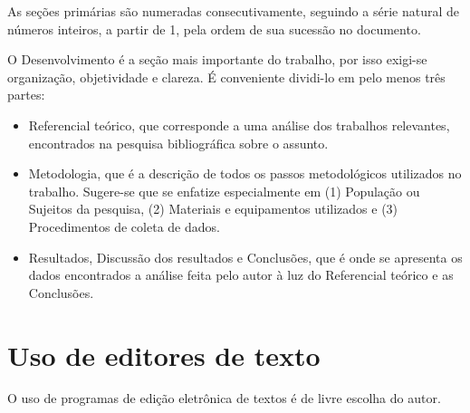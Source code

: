 As seções primárias são numeradas consecutivamente, seguindo a série 
natural de números inteiros, a partir de 1, pela ordem de sua sucessão no 
documento.

O Desenvolvimento é a seção mais importante do trabalho, por isso exigi-se 
organização, objetividade e clareza. É conveniente dividi-lo em pelo menos 
três partes:

\begin{itemize}

	\item Referencial teórico, que corresponde a uma análise dos trabalhos 
	relevantes, encontrados na pesquisa bibliográfica sobre o assunto. 
	\item Metodologia, que é a descrição de todos os passos metodológicos 
	utilizados no trabalho. Sugere-se que se enfatize especialmente em (1) 
	População ou Sujeitos da pesquisa, (2) Materiais e equipamentos 
	utilizados e (3) Procedimentos de coleta de dados.
	\item Resultados, Discussão dos resultados e Conclusões, que é onde se 
	apresenta os dados encontrados a análise feita pelo autor à luz do 
	Referencial teórico e as Conclusões.

\end{itemize}

\section{Uso de editores de texto}

O uso de programas de edição eletrônica de textos é de livre escolha do autor. 

